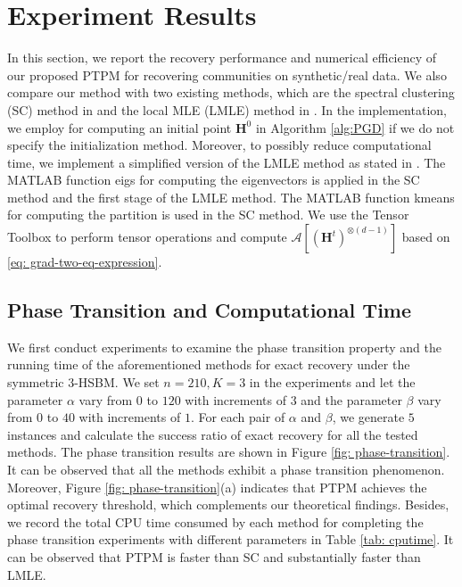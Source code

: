 \documentclass{article}
\theoremstyle{plain}
\theoremstyle{definition}
\theoremstyle{remark}
\newcommand{\BH}{\bm{H}}
\newcommand{\ACal}{\mathcal{A}}
\begin{document}
\section{Experiment Results} \label{sec: experiments}
In this section, we report the recovery performance and numerical efficiency of our proposed PTPM for recovering communities on synthetic/real data. We also compare our method with two existing methods, which are the spectral clustering (SC) method in \citet{ghoshdastidar2015provable} and the local MLE (LMLE) method in \citet{chien2019minimax}. In the implementation, we employ \citet[Algorithm 2]{chien2019minimax} for computing an initial point $\BH^0$ in Algorithm \ref{alg:PGD} if we do not specify the initialization method. Moreover, to possibly reduce computational time, we implement a simplified version of the LMLE method as stated in \citet[Remark 4.2]{chien2019minimax}. The MATLAB function \textsf{eigs} for computing the eigenvectors is applied in the SC method and the first stage of the LMLE method. The MATLAB function \textsf{kmeans} for computing the partition is used in the SC method. We use the Tensor Toolbox \citep{osti_1349514} to perform tensor operations and compute $\ACal\left[ \left(\bm{H}^{t} \right)^{\otimes (d-1)}\right]$ based on \eqref{eq: grad-two-eq-expression}. 
\subsection{Phase Transition and Computational Time}
We first conduct experiments to examine the phase transition property and the running time of the aforementioned methods for exact recovery under the symmetric $3$-HSBM. We set $n=210,K=3$ in the experiments and let the parameter $\alpha$ vary from $0$ to $120$ with increments of $3$ and the parameter $\beta$ vary from $0$ to $40$ with increments of $1$. For each pair of $\alpha$ and $\beta$, we generate $5$ instances and calculate the success ratio of exact recovery for all the tested methods. The phase transition results are shown in Figure \ref{fig: phase-transition}. It can be observed that all the methods exhibit a phase transition phenomenon. Moreover, Figure \ref{fig: phase-transition}(a) indicates that PTPM achieves the optimal recovery threshold, which complements our theoretical findings. Besides, we record the total CPU time consumed by each method for completing the phase transition
experiments with different parameters in Table \ref{tab: cputime}. It can be observed that PTPM is faster than SC and substantially faster than LMLE.
\end{document}
